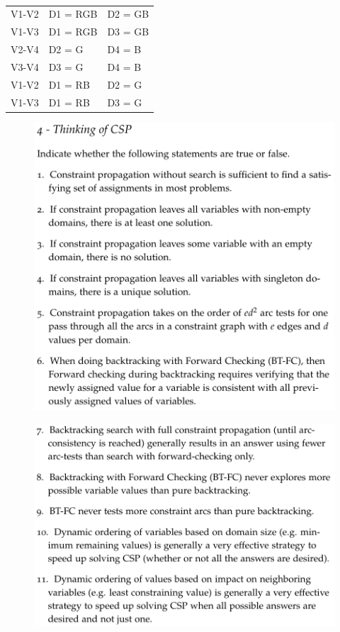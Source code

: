 \documentclass[12pt]{article}
\newenvironment{solution}[2][Solution]{\begin{trivlist}
\item[\hskip \labelsep {\bfseries #1}]}{\end{trivlist}}
\begin{document}
\begin{solution}{}~
\begin{center}
\begin{tabular}{| c | l | l |}
\hline
V1-V2 & D1 = RGB & D2 = GB\\
V1-V3 & D1 = RGB & D3 = GB\\
V2-V4 & D2 = G & D4 = B\\
V3-V4 & D3 = G & D4 = B\\
V1-V2 & D1 = RB & D2 = G\\
V1-V3 & D1 = RB & D3 = G\\
\hline
\end{tabular}
\end{center}
\end{solution}
\pagebreak
\begin{figure}[h!]
\includegraphics[width=\linewidth]{./assets/201807261946.png}
\end{figure}
\begin{figure}[h!]
\includegraphics[width=\linewidth]{./assets/201807261947.png}
\end{figure}
\end{document}
